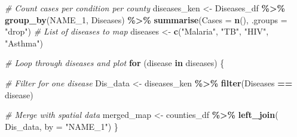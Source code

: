 \documentclass[
]{article}
\newenvironment{Shaded}{\begin{snugshade}}{\end{snugshade}}
\newcommand{\AttributeTok}[1]{\textcolor[rgb]{0.13,0.29,0.53}{#1}}
\newcommand{\CommentTok}[1]{\textcolor[rgb]{0.56,0.35,0.01}{\textit{#1}}}
\newcommand{\ControlFlowTok}[1]{\textcolor[rgb]{0.13,0.29,0.53}{\textbf{#1}}}
\newcommand{\FunctionTok}[1]{\textcolor[rgb]{0.13,0.29,0.53}{\textbf{#1}}}
\newcommand{\NormalTok}[1]{#1}
\newcommand{\OtherTok}[1]{\textcolor[rgb]{0.56,0.35,0.01}{#1}}
\newcommand{\SpecialCharTok}[1]{\textcolor[rgb]{0.81,0.36,0.00}{\textbf{#1}}}
\newcommand{\StringTok}[1]{\textcolor[rgb]{0.31,0.60,0.02}{#1}}
\begin{document}
\begin{Shaded}
\begin{Highlighting}[]
\CommentTok{\# Count cases per condition per county}
\NormalTok{diseases\_ken }\OtherTok{\textless{}{-}}\NormalTok{ Diseases\_df }\SpecialCharTok{\%\textgreater{}\%}
  \FunctionTok{group\_by}\NormalTok{(NAME\_1, Diseases) }\SpecialCharTok{\%\textgreater{}\%}
  \FunctionTok{summarise}\NormalTok{(}\AttributeTok{Cases =} \FunctionTok{n}\NormalTok{(), }\AttributeTok{.groups =} \StringTok{"drop"}\NormalTok{)}
\CommentTok{\# List of diseases to map}
\NormalTok{diseases }\OtherTok{\textless{}{-}} \FunctionTok{c}\NormalTok{(}\StringTok{"Malaria"}\NormalTok{, }\StringTok{"TB"}\NormalTok{, }\StringTok{"HIV"}\NormalTok{, }\StringTok{"Asthma"}\NormalTok{)}
\end{Highlighting}
\end{Shaded}

\begin{Shaded}
\begin{Highlighting}[]
\CommentTok{\# Loop through diseases and plot}
\ControlFlowTok{for}\NormalTok{ (disease }\ControlFlowTok{in}\NormalTok{ diseases) \{}
  
  \CommentTok{\# Filter for one disease}
\NormalTok{  Dis\_data }\OtherTok{\textless{}{-}}\NormalTok{ diseases\_ken }\SpecialCharTok{\%\textgreater{}\%}
    \FunctionTok{filter}\NormalTok{(Diseases }\SpecialCharTok{==}\NormalTok{ disease)}
  
  \CommentTok{\# Merge with spatial data}
\NormalTok{  merged\_map }\OtherTok{\textless{}{-}}\NormalTok{ counties\_df }\SpecialCharTok{\%\textgreater{}\%}
    \FunctionTok{left\_join}\NormalTok{( Dis\_data, }\AttributeTok{by =} \StringTok{"NAME\_1"}\NormalTok{)}
\NormalTok{\}}
\end{Highlighting}
\end{Shaded}
\end{document}
